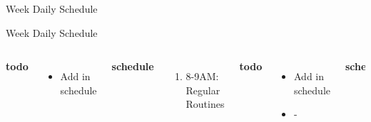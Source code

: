 \documentclass[serif, mathserif, final]{beamer}
\begin{document}
\begin{frame}
\begin{columns}
\begin{column}{0.5\linewidth}
{\begin{block}{Week Daily Schedule}
  \end{block} 
}

  \begin{block}{Week Daily Schedule}

    \begin{columns}
         {\small \bf todo}\\ 
        \begin{itemize}
          \tiny \item \tiny Add in schedule
        \end{itemize} 
        \textbf{\small schedule}\\
        \begin{enumerate} 
          \tiny \item \tiny 8-9AM: Regular Routines 
        \end{enumerate}

        {\small \bf todo}\\ 
        \begin{itemize}
          \tiny \item \tiny Add in schedule
        \item \tiny -
        \end{itemize} 
        \textbf{\small schedule}\\
        \begin{enumerate} 
          \tiny \item \tiny 8-9AM: Regular Routines 
        \end{enumerate} 
        \small{\bf todo}\\ 
        \begin{itemize}
          \tiny \item \tiny Add in schedule
        \item \tiny -
        \end{itemize} 
        {\small \bf schedule}\\
        \begin{enumerate} 
          \tiny \item \tiny 8-9AM: Regular Routines 
        \end{enumerate} 


\end{columns}
\end{block}
\end{column}
\end{columns}
\end{frame}
\end{document}
